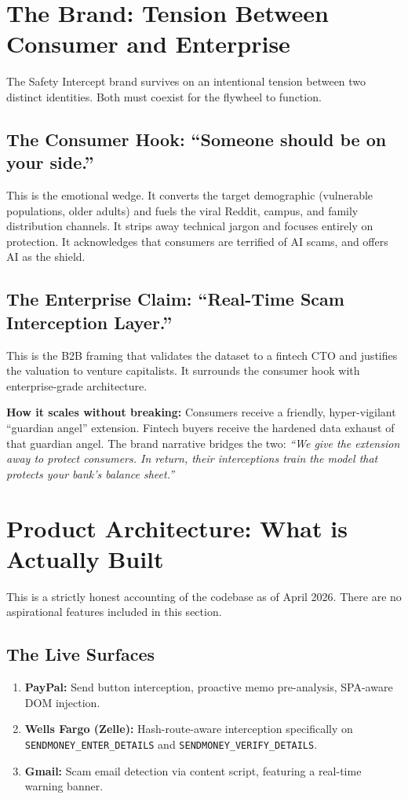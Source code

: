 \documentclass[12pt, letterpaper]{article}
\begin{document}
\newpage
\section{The Brand: Tension Between Consumer and Enterprise}

The Safety Intercept brand survives on an intentional tension between two distinct identities. Both must coexist for the flywheel to function.

\subsection{The Consumer Hook: ``Someone should be on your side.''}
This is the emotional wedge. It converts the target demographic (vulnerable populations, older adults) and fuels the viral Reddit, campus, and family distribution channels. It strips away technical jargon and focuses entirely on protection. It acknowledges that consumers are terrified of AI scams, and offers AI as the shield.

\subsection{The Enterprise Claim: ``Real-Time Scam Interception Layer.''}
This is the B2B framing that validates the dataset to a fintech CTO and justifies the valuation to venture capitalists. It surrounds the consumer hook with enterprise-grade architecture. 

\textbf{How it scales without breaking:} 
Consumers receive a friendly, hyper-vigilant ``guardian angel'' extension. Fintech buyers receive the hardened data exhaust of that guardian angel. The brand narrative bridges the two: \textit{``We give the extension away to protect consumers. In return, their interceptions train the model that protects your bank's balance sheet.''}

\newpage
\section{Product Architecture: What is Actually Built}

This is a strictly honest accounting of the codebase as of April 2026. There are no aspirational features included in this section.

\subsection{The Live Surfaces}
\begin{enumerate}
    \item \textbf{PayPal:} Send button interception, proactive memo pre-analysis, SPA-aware DOM injection.
    \item \textbf{Wells Fargo (Zelle):} Hash-route-aware interception specifically on \texttt{SENDMONEY\_ENTER\_DETAILS} and \texttt{SENDMONEY\_VERIFY\_DETAILS}.
    \item \textbf{Gmail:} Scam email detection via content script, featuring a real-time warning banner.
\end{enumerate}
\end{document}
